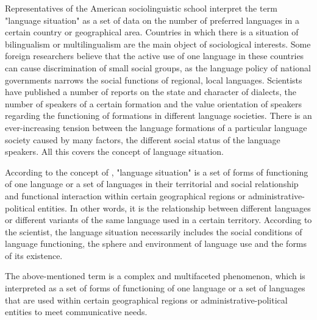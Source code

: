 \documentclass[english]{textolivre}
\begin{document}
Representatives of the American sociolinguistic school interpret the term "language situation" as a set of data on the number of preferred languages in a certain country or geographical area. Countries in which there is a situation of bilingualism or multilingualism are the main object of sociological interests. Some foreign researchers believe that the active use of one language in these countries can cause discrimination of small social groups, as the language policy of national governments narrows the social functions of regional, local languages. Scientists have published a number of reports on the state and character of dialects, the number of speakers of a certain formation and the value orientation of speakers regarding the functioning of formations in different language societies. There is an ever-increasing tension between the language formations of a particular language society caused by many factors, the different social status of the language speakers. All this covers the concept of language situation.

According to the concept of \textcite[p. 326-327]{kochergan2010}, "language situation" is a set of forms of functioning of one language or a set of languages in their territorial and social relationship and functional interaction within certain geographical regions or administrative-political entities. In other words, it is the relationship between different languages or different variants of the same language used in a certain territory. According to the scientist, the language situation necessarily includes the social conditions of language functioning, the sphere and environment of language use and the forms of its existence.

The above-mentioned term is a complex and multifaceted phenomenon, which is interpreted as a set of forms of functioning of one language or a set of languages that are used within certain geographical regions or administrative-political entities to meet communicative needs.
\end{document}
